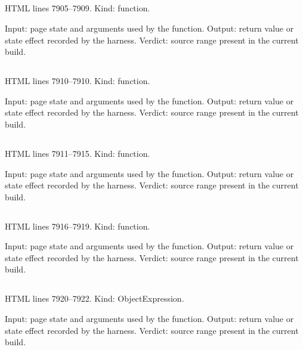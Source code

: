 \subsection*{\texttt{}}
\label{vf_402_appTaskStart}
HTML lines 7905--7909. Kind: function.

Input: page state and arguments used by the function.
Output: return value or state effect recorded by the harness.
Verdict: source range present in the current build.

\subsection*{\texttt{}}
\label{vf_403_appTaskStep}
HTML lines 7910--7910. Kind: function.

Input: page state and arguments used by the function.
Output: return value or state effect recorded by the harness.
Verdict: source range present in the current build.

\subsection*{\texttt{}}
\label{vf_404_appTaskEnd}
HTML lines 7911--7915. Kind: function.

Input: page state and arguments used by the function.
Output: return value or state effect recorded by the harness.
Verdict: source range present in the current build.

\subsection*{\texttt{}}
\label{vf_405_appTaskWrap}
HTML lines 7916--7919. Kind: function.

Input: page state and arguments used by the function.
Output: return value or state effect recorded by the harness.
Verdict: source range present in the current build.

\subsection*{\texttt{}}
\label{vf_406_APP_TASK_LABEL}
HTML lines 7920--7922. Kind: ObjectExpression.

Input: page state and arguments used by the function.
Output: return value or state effect recorded by the harness.
Verdict: source range present in the current build.

